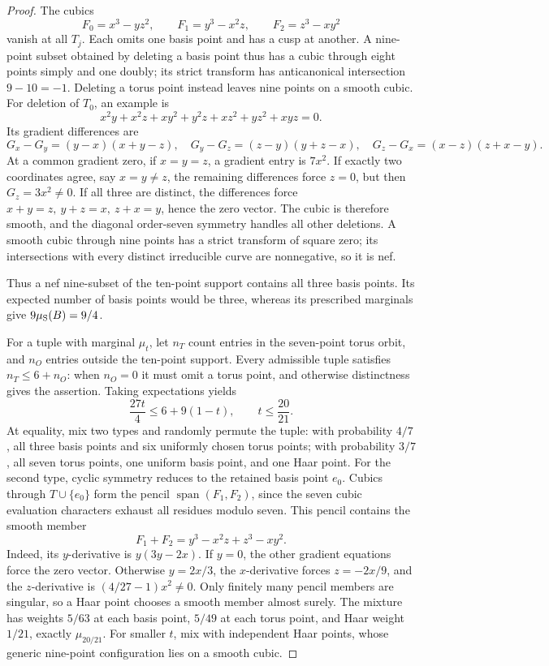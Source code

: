 \begin{proof}
The cubics
\[
 F_0=x^3-yz^2,\qquad F_1=y^3-x^2z,\qquad F_2=z^3-xy^2
\]
vanish at all \(T_j\). Each omits one basis point and has a cusp at
another. A nine-point subset obtained by deleting a basis point thus
has a cubic through eight points simply and one doubly; its strict
transform has anticanonical intersection \(9-10=-1\).
Deleting a torus point instead leaves nine points on a smooth cubic.
For deletion of \(T_0\), an example is
\[
 x^2y+x^2z+xy^2+y^2z+xz^2+yz^2+xyz=0.
\]
Its gradient differences are
\[
 G_x-G_y=(y-x)(x+y-z),\quad
 G_y-G_z=(z-y)(y+z-x),\quad
 G_z-G_x=(x-z)(z+x-y).
\]
At a common gradient zero, if \(x=y=z\), a gradient entry is \(7x^2\).
If exactly two coordinates agree, say \(x=y\ne z\), the remaining
differences force \(z=0\), but then \(G_z=3x^2\ne0\).
If all three are distinct, the differences force
\(x+y=z,\ y+z=x,\ z+x=y\), hence the zero vector.
The cubic is therefore smooth, and
the diagonal order-seven symmetry handles all other deletions.
A smooth cubic through nine points has a strict transform of square
zero; its intersections with every distinct irreducible curve are
nonnegative, so it is nef.

Thus a nef nine-subset of the ten-point support contains all three
basis points. Its expected number of basis points would be three,
whereas its prescribed marginals give \(9\mu_{\rm S}(B)=9/4\).

For a tuple with marginal \(\mu_t\), let \(n_T\) count entries in the
seven-point torus orbit, and \(n_O\) entries outside the ten-point
support. Every admissible tuple satisfies \(n_T\le6+n_O\): when
\(n_O=0\) it must omit a torus point, and otherwise distinctness gives
the assertion. Taking expectations yields
\[
 \frac{27t}{4}\le6+9(1-t),\qquad t\le\frac{20}{21}.
\]
At equality, mix two types and randomly permute the tuple:
with probability \(4/7\), all three basis points and six uniformly
chosen torus points; with probability \(3/7\), all seven torus points,
one uniform basis point, and one Haar point.
For the second type, cyclic symmetry reduces to the retained basis
point \(e_0\). Cubics through \(T\cup\{e_0\}\) form the pencil
\(\operatorname{span}(F_1,F_2)\), since the seven cubic evaluation
characters exhaust all residues modulo seven.
This pencil contains the smooth member
\[
 F_1+F_2=y^3-x^2z+z^3-xy^2.
\]
Indeed, its \(y\)-derivative is \(y(3y-2x)\). If \(y=0\), the other
gradient equations force the zero vector. Otherwise \(y=2x/3\),
the \(x\)-derivative forces \(z=-2x/9\), and the \(z\)-derivative is
\((4/27-1)x^2\ne0\). Only finitely many pencil members are singular,
so a Haar point chooses a smooth member almost surely.
The mixture has weights \(5/63\) at each basis point, \(5/49\) at
each torus point, and Haar weight \(1/21\), exactly \(\mu_{20/21}\).
For smaller \(t\), mix with independent Haar points, whose generic
nine-point configuration lies on a smooth cubic.
\end{proof}

